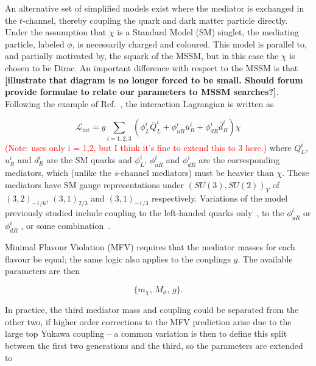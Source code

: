 

An alternative set of simplified models exist where the mediator is exchanged in the $t$-channel, thereby coupling the quark and dark matter particle directly. Under the assumption that $\chi$ is a Standard Model (SM) singlet, the mediating particle, labeled $\phi$, is necessarily charged and coloured. This model is parallel to, and partially motivated by, the squark of the MSSM, but in this case the $\chi$ is chosen to be Dirac. An important difference with respect to the MSSM is that {\bf [illustrate that diagram is no longer forced to be small. Should forum provide formulae to relate our parameters to MSSM searches?]}. Following the example of Ref.~\cite{Papucci:2014}, the interaction Lagrangian is written as

\begin{equation}
\mathcal{L}_{\mathrm{int}} = g \sum_{i=1,2,3} (\phi_L^i \bar{Q}_L^i + \phi_{uR}^i \bar{u}_R^i + \phi_{dR}^i \bar{d}_R^i) \chi
\end{equation}
\textcolor{red}{(Note: \cite{Papucci:2014} uses only i = 1,2, but I think it's fine to extend this to 3 here.)}
where $Q_L^i$, $u_R^i$ and $d_R^i$ are the SM quarks and $\phi_L^i$, $\phi_{uR}^i$ and $\phi_{dR}^i$ are the corresponding mediators, which (unlike the $s$-channel mediators) must be heavier than $\chi$. These mediators have SM gauge representations under $(SU(3), SU(2))_Y$ of $(3,2)_{-1/6}$, $(3,1)_{2/3}$ and $(3,1)_{-1/3}$ respectively. Variations of the model previously studied include coupling to the left-handed quarks only~\cite{Chang:2014, Busoni:2014haa}, to the $\phi_{uR}^i$ \cite{Tait:2013} or $\phi_{dR}^i$ \cite{Papucci:2014, Yavin:14092893}, or some combination~\cite{Bai:201311171, An:201489115014}.

\vspace{5mm}

Minimal Flavour Violation (MFV) requires that the mediator masses for each flavour be equal; the same logic also applies to the couplings $g$. The available parameters are then

\begin{equation}
\{ m_{\chi},\, M_{\phi},\, g\}.
\end{equation}

In practice, the third mediator mass and coupling could be separated from the other two, if higher order corrections to the MFV prediction arise due to the large top Yukawa coupling -- a common variation is then to define this split between the first two generations and the third, so the parameters are extended to

